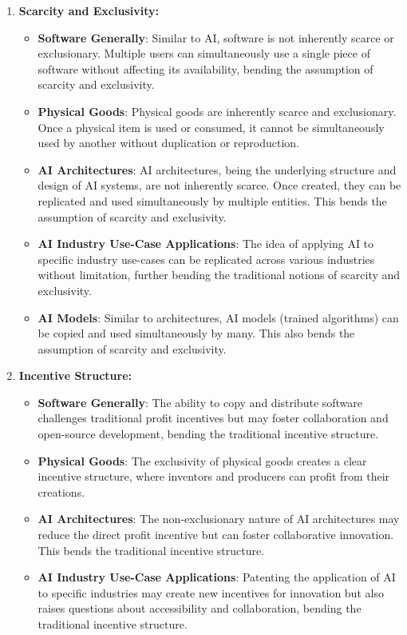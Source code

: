 \documentclass{article}[10pt]
\begin{document}
\begin{enumerate}
    \item \textbf{Scarcity and Exclusivity:}
    \begin{itemize}
	   \item \textbf{Software Generally}: Similar to AI, software is not inherently scarce or exclusionary. Multiple users can simultaneously use a single piece of software without affecting its availability, bending the assumption of scarcity and exclusivity.
	   \item \textbf{Physical Goods}: Physical goods are inherently scarce and exclusionary. Once a physical item is used or consumed, it cannot be simultaneously used by another without duplication or reproduction.
	   \item \textbf{AI Architectures}: AI architectures, being the underlying structure and design of AI systems, are not inherently scarce. Once created, they can be replicated and used simultaneously by multiple entities. This bends the assumption of scarcity and exclusivity.
	   \item \textbf{AI Industry Use-Case Applications}: The idea of applying AI to specific industry use-cases can be replicated across various industries without limitation, further bending the traditional notions of scarcity and exclusivity.
	   \item \textbf{AI Models}: Similar to architectures, AI models (trained algorithms) can be copied and used simultaneously by many. This also bends the assumption of scarcity and exclusivity.
    \end{itemize}
    \item \textbf{Incentive Structure:}
    \begin{itemize}
    	\item \textbf{Software Generally}: The ability to copy and distribute software challenges traditional profit incentives but may foster collaboration and open-source development, bending the traditional incentive structure.
    	\item \textbf{Physical Goods}: The exclusivity of physical goods creates a clear incentive structure, where inventors and producers can profit from their creations.
    	\item \textbf{AI Architectures}: The non-exclusionary nature of AI architectures may reduce the direct profit incentive but can foster collaborative innovation. This bends the traditional incentive structure.
    	\item \textbf{AI Industry Use-Case Applications}: Patenting the application of AI to specific industries may create new incentives for innovation but also raises questions about accessibility and collaboration, bending the traditional incentive structure.

\end{itemize}
\end{enumerate}
\end{document}
